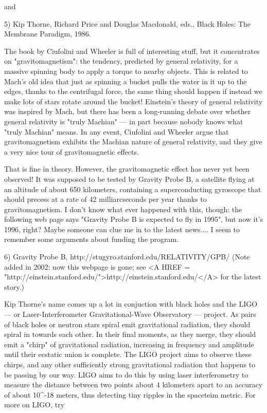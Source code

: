 and 

5) Kip Thorne, Richard Price and Douglas Macdonald, eds., Black Holes:
The Membrane Paradigm, 1986.

The book by Ciufolini and Wheeler is full of interesting stuff, but it
concentrates on "gravitomagnetism": the tendency, predicted by general
relativity, for a massive spinning body to apply a torque to nearby
objects.  This is related to Mach's old idea that just as spinning a
bucket pulls the water in it up to the edges, thanks to the centrifugal
force, the same thing should happen if instead we make lots of stars
rotate around the bucket!  Einstein's theory of general relativity was
inspired by Mach, but there has been a long-running debate over whether
general relativity is "truly Machian" --- in part because nobody knows
what "truly Machian" means.  In any event, Ciufolini and Wheeler argue
that gravitomagnetism exhibits the Machian nature of general relativity,
and they give a very nice tour of gravitomagnetic effects.

That is fine in theory.  However, the gravitomagnetic effect has never
yet been observed!   It was supposed to be tested by Gravity Probe B, a
satellite flying at an altitude of about 650 kilometers, containing a
superconducting gyroscope that should precess at a rate of 42
milliarcseconds per year thanks to gravitomagnetism.  I don't know what
ever happened with this, though: the following web page says "Gravity
Probe B is expected to fly in 1995", but now it's 1996, right?  Maybe
someone can clue me in to the latest news.... I seem to remember some
arguments about funding the program.

6) Gravity Probe B, http://stugyro.stanford.edu/RELATIVITY/GPB/
(Note added in 2002: now this webpage is gone; see
<A HREF = "http://einstein.stanford.edu/">http://einstein.stanford.edu/</A>
for the latest story.) 

Kip Thorne's name comes up a lot in conjuction with black holes and the
LIGO --- or Laser-Interferometer Gravitational-Wave Observatory --- project.
As pairs of black holes or neutron stars spiral emit gravitational
radiation, they should spiral in towards each other.  In their final
moments, as they merge, they should emit a "chirp" of gravitational
radiation, increasing in frequency and amplitude until their ecstatic
union is complete.  The LIGO project aims to observe these chirps, and
any other sufficiently strong gravitational radiation that happens to be
passing by our way.  LIGO aims to do this by using laser interferometry
to measure the distance between two points about 4 kilometers apart to
an accuracy of about 10^{-18} meters, thus detecting tiny ripples in the
spaceteim metric.  For more on LIGO, try

